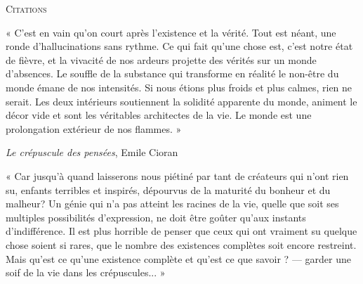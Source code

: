 \documentclass{article}
\begin{document}
\begin{center}\textsc{Citations}\end{center}
\vspace{30pt}

\begin{center} « C’est en vain qu’on court après l’existence et la vérité. Tout est néant, une ronde d’hallucinations sans rythme. Ce qui fait qu’une chose est, c’est notre état de fièvre, et la vivacité de nos ardeurs projette des vérités sur un monde d’absences. Le souffle de la substance qui transforme en réalité le non-être du monde émane de nos intensités. Si nous étions plus froids et plus calmes, rien ne serait. Les deux intérieurs soutiennent la solidité apparente du monde, animent le décor vide et sont les véritables architectes de la vie. Le monde est une prolongation extérieur de nos flammes. » \end{center} 

\begin{flushright}\textit{Le crépuscule des pensées}, Emile Cioran\end{flushright}
\vspace{8pt}
\begin{center} « Car jusqu’à quand laisserons nous piétiné par tant de créateurs qui n’ont rien su, enfants terribles et inspirés, dépourvus de la maturité du bonheur et du malheur? Un génie qui n’a pas atteint les racines de la vie, quelle que soit ses multiples possibilités d’expression, ne doit être goûter qu’aux instants d’indifférence. Il est plus horrible de penser que ceux qui ont vraiment su quelque chose soient si rares, que le nombre des existences complètes soit encore restreint. Mais qu’est ce qu’une existence complète et qu’est ce que savoir ? — garder une soif de la vie dans les crépuscules... »\end{center}
\end{document}
